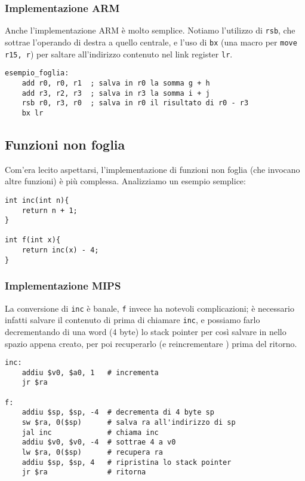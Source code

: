 \documentclass[class=book, crop=false, oneside]{standalone}
\begin{document}
\subsubsection{Implementazione ARM}
Anche l'implementazione ARM è molto semplice. Notiamo l'utilizzo di \texttt{rsb}, che sottrae l'operando di destra a quello centrale, e l'uso di \texttt{bx} (una macro per \texttt{move r15, r}) per saltare all'indirizzo contenuto nel link register \texttt{lr}.
\begin{verbatim}
esempio_foglia:
	add r0, r0, r1  ; salva in r0 la somma g + h
	add r3, r2, r3  ; salva in r3 la somma i + j
	rsb r0, r3, r0  ; salva in r0 il risultato di r0 - r3
	bx lr
\end{verbatim}

\subsection*{Funzioni non foglia}
Com'era lecito aspettarsi, l'implementazione di funzioni non foglia (che invocano altre funzioni) è più complessa. Analizziamo un esempio semplice:
\begin{verbatim}
int inc(int n){
	return n + 1;
}

int f(int x){
	return inc(x) - 4;
}
\end{verbatim}

\subsubsection{Implementazione MIPS}
La conversione di \texttt{inc} è banale, \texttt{f} invece ha notevoli complicazioni; è necessario infatti salvare il contenuto di  prima di chiamare \texttt{inc}, e possiamo farlo decrementando di una word (4 byte) lo stack pointer per così salvare  in  nello spazio appena creato, per poi recuperarlo (e reincrementare ) prima del ritorno.
\begin{verbatim}
inc:
	addiu $v0, $a0, 1   # incrementa
	jr $ra

f:
	addiu $sp, $sp, -4  # decrementa di 4 byte sp
	sw $ra, 0($sp)      # salva ra all'indirizzo di sp
	jal inc	            # chiama inc
	addiu $v0, $v0, -4  # sottrae 4 a v0
	lw $ra, 0($sp)      # recupera ra
	addiu $sp, $sp, 4   # ripristina lo stack pointer
	jr $ra              # ritorna
\end{verbatim}
\end{document}
